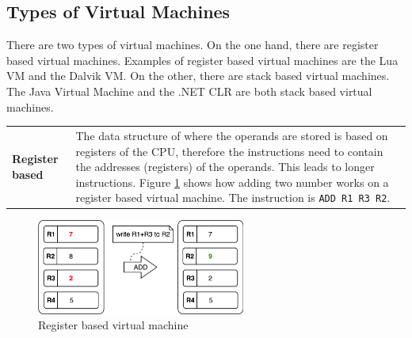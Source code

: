 \subsection{Types of Virtual Machines}
There are two types of virtual machines. On the one hand, there are register based virtual machines. Examples of register based virtual machines are the Lua VM and the Dalvik VM. On the other, there are stack based virtual machines. The Java Virtual Machine and the .NET CLR are both stack based virtual machines. \cite{stackvsregistervm}

\begin{tabular}[t]{ p{3cm} p{12.5cm}}
\raggedright
\textbf{Register based} &
The data structure of where the operands are stored is based on registers of the CPU, therefore the instructions need to contain the addresses (registers) of the operands. This leads to longer instructions. Figure \ref{register vm} shows how adding two number works on a register based virtual machine. \cite{stackvsregistervm} The instruction is \texttt{ADD R1 R3 R2}.
\end{tabular}
\begin{figure}[H]
	\begin{center}
	\includegraphics[width=0.61\textwidth]{./images/register-example}
	\caption{Register based virtual machine}
	\label{register vm}
	\end{center}
\end{figure}

